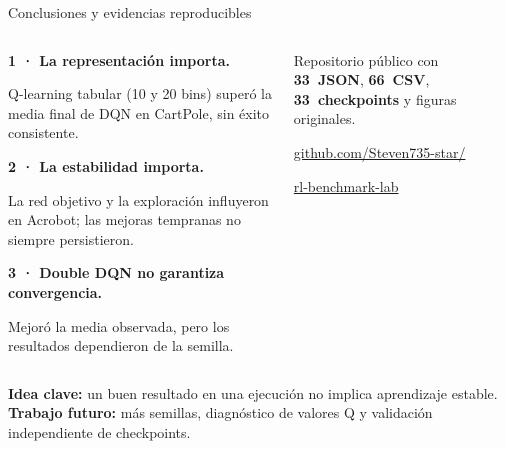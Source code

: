 \documentclass[aspectratio=169,10pt,t]{beamer}
\begin{document}
\begin{frame}{Conclusiones y evidencias reproducibles}
\begin{columns}[T,onlytextwidth]
\begin{info}
\small\textbf{1 · La representación importa.}\par
Q-learning tabular (10 y 20 bins) superó la media final de DQN en CartPole, sin éxito consistente.\par\vspace{.10cm}
\small\textbf{2 · La estabilidad importa.}\par
La red objetivo y la exploración influyeron en Acrobot; las mejoras tempranas no siempre persistieron.\par\vspace{.10cm}
\small\textbf{3 · Double DQN no garantiza convergencia.}\par
Mejoró la media observada, pero los resultados dependieron de la semilla.
\end{info}
\begin{takeaway}
\par\vspace{.12cm}
\small Repositorio público con \mbox{\textbf{33 JSON}}, \mbox{\textbf{66 CSV}}, \mbox{\textbf{33 checkpoints}} y figuras originales.\par\vspace{.23cm}
\small\href{https://github.com/Steven735-star/rl-benchmark-lab}{github.com/Steven735-star/}\par\small\href{https://github.com/Steven735-star/rl-benchmark-lab}{rl-benchmark-lab}
\end{takeaway}
\end{columns}
\vspace{.12cm}
\begin{info}\small\textbf{Idea clave:} un buen resultado en una ejecución no implica aprendizaje estable. \textbf{Trabajo futuro:} más semillas, diagnóstico de valores Q y validación independiente de checkpoints.\end{info}
\end{frame}
\end{document}
